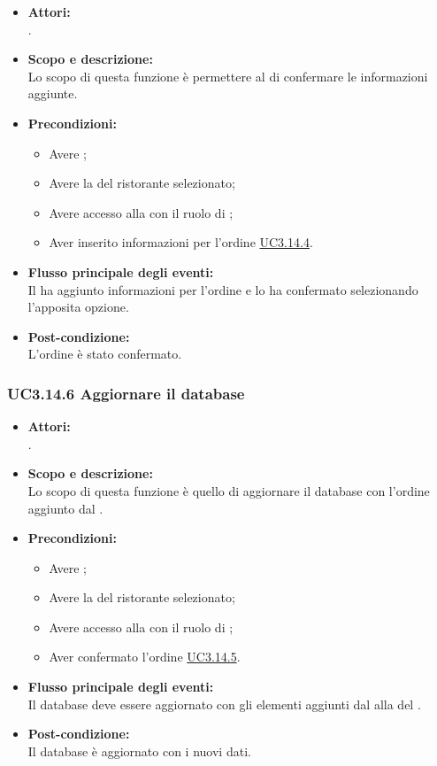 \begin{itemize}
	\item \textbf{Attori:}
	\\.
	\item \textbf{Scopo e descrizione:} 
	\\Lo scopo di questa funzione è permettere al  di confermare le informazioni aggiunte.
	\item \textbf{Precondizioni:}
	\begin{itemize}
		\item Avere ;
		\item Avere la  del ristorante selezionato;
		\item Avere accesso alla  con il ruolo di ;
		\item Aver inserito informazioni per l'ordine \hyperref[UC3.14.4]{UC3.14.4}.
	\end{itemize}
	\item \textbf{Flusso principale degli eventi:}
	\\Il {} ha aggiunto informazioni per l'ordine e lo ha confermato selezionando l'apposita opzione.
	\item \textbf{Post-condizione:}
	\\L'ordine è stato confermato.
\end{itemize}

\subsubsection{UC3.14.6 Aggiornare il database} \label{UC3.14.6}

\begin{itemize}
	\item \textbf{Attori:}
	\\.
	\item \textbf{Scopo e descrizione:} 
	\\Lo scopo di questa funzione è quello di aggiornare il database con l'ordine aggiunto dal .
	\item \textbf{Precondizioni:}
	\begin{itemize}
		\item Avere ;
		\item Avere la  del ristorante selezionato;
		\item Avere accesso alla  con il ruolo di ;
		\item Aver confermato l'ordine \hyperref[UC3.14.5]{UC3.14.5}.
	\end{itemize}
	\item \textbf{Flusso principale degli eventi:}
	\\Il database deve essere aggiornato con gli elementi aggiunti dal  alla  del .
	\item \textbf{Post-condizione:}
	\\Il database è aggiornato con i nuovi dati.
\end{itemize}

